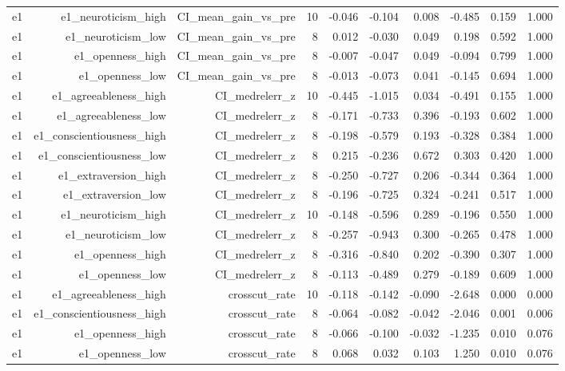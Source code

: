 \documentclass[11pt]{article}
\begin{document}
\begin{landscape}
\begin{longtable}{@{}lrrrrrrrrr@{}}
e1 & e1\_neuroticism\_high & CI\_mean\_gain\_vs\_pre & 10 & -0.046 & -0.104 & 0.008 & -0.485 & 0.159 & 1.000 \\
e1 & e1\_neuroticism\_low & CI\_mean\_gain\_vs\_pre & 8 & 0.012 & -0.030 & 0.049 & 0.198 & 0.592 & 1.000 \\
e1 & e1\_openness\_high & CI\_mean\_gain\_vs\_pre & 8 & -0.007 & -0.047 & 0.049 & -0.094 & 0.799 & 1.000 \\
e1 & e1\_openness\_low & CI\_mean\_gain\_vs\_pre & 8 & -0.013 & -0.073 & 0.041 & -0.145 & 0.694 & 1.000 \\
e1 & e1\_agreeableness\_high & CI\_medrelerr\_z & 10 & -0.445 & -1.015 & 0.034 & -0.491 & 0.155 & 1.000 \\
e1 & e1\_agreeableness\_low & CI\_medrelerr\_z & 8 & -0.171 & -0.733 & 0.396 & -0.193 & 0.602 & 1.000 \\
e1 & e1\_conscientiousness\_high & CI\_medrelerr\_z & 8 & -0.198 & -0.579 & 0.193 & -0.328 & 0.384 & 1.000 \\
e1 & e1\_conscientiousness\_low & CI\_medrelerr\_z & 8 & 0.215 & -0.236 & 0.672 & 0.303 & 0.420 & 1.000 \\
e1 & e1\_extraversion\_high & CI\_medrelerr\_z & 8 & -0.250 & -0.727 & 0.206 & -0.344 & 0.364 & 1.000 \\
e1 & e1\_extraversion\_low & CI\_medrelerr\_z & 8 & -0.196 & -0.725 & 0.324 & -0.241 & 0.517 & 1.000 \\
e1 & e1\_neuroticism\_high & CI\_medrelerr\_z & 10 & -0.148 & -0.596 & 0.289 & -0.196 & 0.550 & 1.000 \\
e1 & e1\_neuroticism\_low & CI\_medrelerr\_z & 8 & -0.257 & -0.943 & 0.300 & -0.265 & 0.478 & 1.000 \\
e1 & e1\_openness\_high & CI\_medrelerr\_z & 8 & -0.316 & -0.840 & 0.202 & -0.390 & 0.307 & 1.000 \\
e1 & e1\_openness\_low & CI\_medrelerr\_z & 8 & -0.113 & -0.489 & 0.279 & -0.189 & 0.609 & 1.000 \\
e1 & e1\_agreeableness\_high & crosscut\_rate & 10 & -0.118 & -0.142 & -0.090 & -2.648 & 0.000 & 0.000 \\
e1 & e1\_conscientiousness\_high & crosscut\_rate & 8 & -0.064 & -0.082 & -0.042 & -2.046 & 0.001 & 0.006 \\
e1 & e1\_openness\_high & crosscut\_rate & 8 & -0.066 & -0.100 & -0.032 & -1.235 & 0.010 & 0.076 \\
e1 & e1\_openness\_low & crosscut\_rate & 8 & 0.068 & 0.032 & 0.103 & 1.250 & 0.010 & 0.076 \\

\end{longtable}
\end{landscape}
\end{document}

